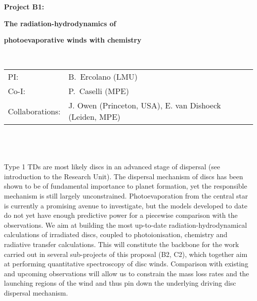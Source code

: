 \documentclass[10pt,fleqn,twoside]{article}
\newcommand{\Tcol}{\color{blue}}
\begin{document}
\newpage


\setcounter{page}{1}

\centerline{\huge\bf\Tcol
%
%
%
%
%
 Project B1:}

\centerline{\huge\bf\Tcol The radiation-hydrodynamics of}

\centerline{\huge\bf\Tcol photoevaporative winds with chemistry}

%
%
%
%
%
\vskip1.0cm

\\
\begin{tabular}{ll}
{\textsf{PI:}}                  & B.~Ercolano (LMU)\\
{\textsf{Co-I:}}                &P.~Caselli (MPE)\\
{\textsf{Collaborations:}}      & J. Owen (Princeton, USA), E. van Dishoeck (Leiden, MPE)  \
\end{tabular}


\vspace{1em}
 \\

\vspace{1em}
\\

\\
Type 1 TDs are most likely discs in an advanced stage of dispersal
(see introduction to the Research Unit). The
dispersal mechanism of discs has been shown to be of fundamental importance to planet
formation, yet the responsible mechanism is still largely
unconstrained. Photoevaporation from the central star is currently a
promising avenue to investigate, but the models developed to date do
not yet have enough predictive power for a piecewise comparison with
the observations. We aim at building the most
up-to-date radiation-hydrodynamical calculations of irradiated discs, 
coupled to photoionisation, chemistry and radiative transfer
calculations. This will constitute the backbone for the work carried
out in several sub-projects of this proposal (B2, C2), which together
aim at performing quantitative
spectroscopy of disc winds. Comparison with existing and upcoming
observations will allow us to constrain the mass loss rates and the
launching regions of the wind and thus pin down the underlying driving disc
dispersal mechanism. 
\end{document}
